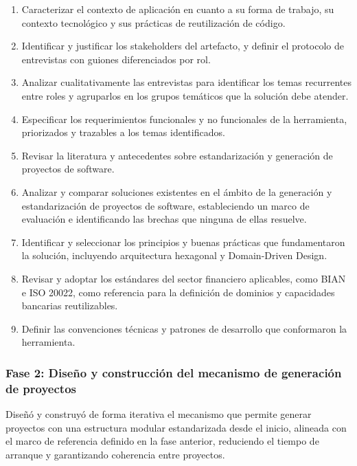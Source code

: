 \begin{enumerate}
    \item Caracterizar el contexto de aplicación en cuanto a su forma de trabajo, su contexto tecnológico y sus prácticas de reutilización de código.

    \item Identificar y justificar los stakeholders del artefacto, y definir el protocolo de entrevistas con guiones diferenciados por rol.

    \item Analizar cualitativamente las entrevistas para identificar los temas recurrentes entre roles y agruparlos en los grupos temáticos que la solución debe atender.

    \item Especificar los requerimientos funcionales y no funcionales de la herramienta, priorizados y trazables a los temas identificados.

    \item Revisar la literatura y antecedentes sobre estandarización y generación de proyectos de software.

    \item Analizar y comparar soluciones existentes en el ámbito de la generación y estandarización de proyectos de software, estableciendo un marco de evaluación e identificando las brechas que ninguna de ellas resuelve.

    \item Identificar y seleccionar los principios y buenas prácticas que fundamentaron la solución, incluyendo arquitectura hexagonal y Domain-Driven Design.

    \item Revisar y adoptar los estándares del sector financiero aplicables, como BIAN e ISO 20022, como referencia para la definición de dominios y capacidades bancarias reutilizables.

    \item Definir las convenciones técnicas y patrones de desarrollo que conformaron la herramienta.
\end{enumerate}

\subsubsection*{Fase 2: Diseño y construcción del mecanismo de generación de proyectos}

Diseñó y construyó de forma iterativa el mecanismo que permite generar proyectos con una estructura modular estandarizada desde el inicio, alineada con el marco de referencia definido en la fase anterior, reduciendo el tiempo de arranque y garantizando coherencia entre proyectos.

